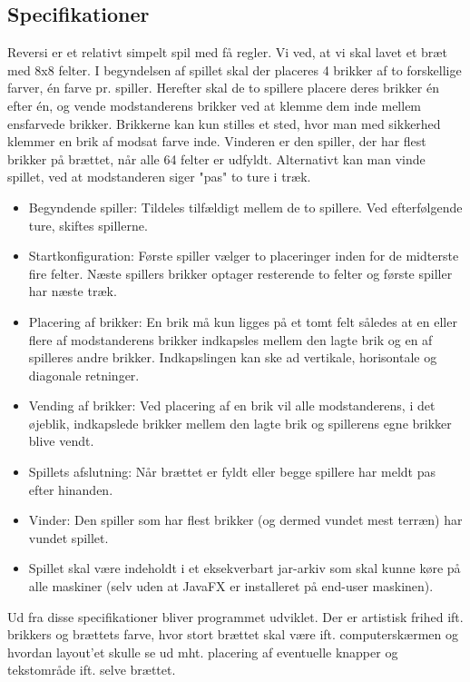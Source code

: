 \subsection{Specifikationer}\label{sec:speci}
Reversi er et relativt simpelt spil med få regler. Vi ved, at vi skal lavet et bræt med 8x8 felter. I begyndelsen af spillet skal der placeres 4 brikker af to forskellige farver, én farve pr. spiller. Herefter skal de to spillere placere deres brikker én efter én, og vende modstanderens brikker ved at klemme dem inde mellem ensfarvede brikker. Brikkerne kan kun stilles et sted, hvor man med sikkerhed klemmer en brik af modsat farve inde. Vinderen er den spiller, der har flest brikker på brættet, når alle 64 felter er udfyldt. Alternativt kan man vinde spillet, ved at modstanderen siger "pas" to ture i træk.
\begin{itemize}
    \item Begyndende spiller: Tildeles tilfældigt mellem de to spillere. Ved efterfølgende ture, skiftes spillerne.
    \item Startkonfiguration: Første spiller vælger to placeringer inden for de midterste fire felter. Næste spillers brikker optager resterende to felter og første spiller har næste træk.
    \item Placering af brikker: En brik må kun ligges på et tomt felt således at en eller flere af modstanderens brikker indkapsles mellem den lagte brik og en af spilleres andre brikker. Indkapslingen kan ske ad vertikale, horisontale og diagonale retninger.
    \item Vending af brikker: Ved placering af en brik vil alle modstanderens, i det øjeblik, indkapslede brikker mellem den lagte brik og spillerens egne brikker blive vendt.
    \item Spillets afslutning: Når brættet er fyldt eller begge spillere har meldt pas efter hinanden.
    \item Vinder: Den spiller som har flest brikker (og dermed vundet mest terræn) har vundet spillet.
    \item Spillet skal være indeholdt i et eksekverbart jar-arkiv som skal kunne køre på alle maskiner (selv uden at JavaFX er installeret på end-user maskinen).
\end{itemize}
Ud fra disse specifikationer bliver programmet udviklet. Der er artistisk frihed ift. brikkers og brættets farve, hvor stort brættet skal være ift. computerskærmen og hvordan layout'et skulle se ud mht. placering af eventuelle knapper og tekstområde ift. selve brættet. 
